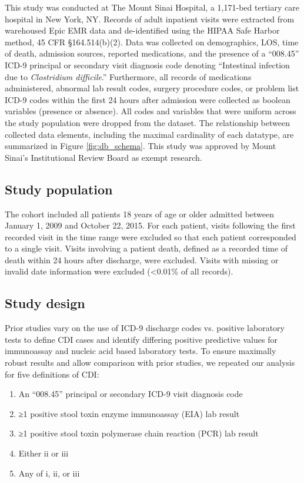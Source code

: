 This study was conducted at The Mount Sinai Hospital, a 1,171-bed tertiary care hospital in New York, NY. Records of adult inpatient visits were extracted from warehoused Epic EMR data and de-identified using the HIPAA Safe Harbor method, 45 CFR §164.514(b)(2). Data was collected on demographics, LOS, time of death, admission sources, reported medications, and the presence of a “008.45” ICD-9 principal or secondary visit diagnosis code denoting “Intestinal infection due to \emph{Clostridium difficile}.” Furthermore, all records of medications administered, abnormal lab result codes, surgery procedure codes, or problem list ICD-9 codes within the first 24 hours after admission were collected as boolean variables (presence or absence). All codes and variables that were uniform across the study population were dropped from the dataset. The relationship between collected data elements, including the maximal cardinality of each datatype, are summarized in Figure \ref{fig:db_schema}. This study was approved by Mount Sinai’s Institutional Review Board as exempt research.

\subsection{Study population}

The cohort included all patients 18 years of age or older admitted between January 1, 2009 and October 22, 2015. For each patient, visits following the first recorded visit in the time range were excluded so that each patient corresponded to a single visit. Visits involving a patient death, defined as a recorded time of death within 24 hours after discharge, were excluded. Visits with missing or invalid date information were excluded (<0.01\% of all records). 

\subsection{Study design}

Prior studies vary on the use of ICD-9 discharge codes vs. positive laboratory tests to define CDI cases\autocite{Gabriel2014,Zhang2016} and identify differing positive predictive values for immunoassay and nucleic acid based laboratory tests.\autocite{Bagdasarian2015,Moehring2013,Polage2015} To ensure maximally robust results and allow comparison with prior studies, we repeated our analysis for five definitions of CDI:

\begin{enumerate}[label=(\roman*),noitemsep,labelindent=2em,leftmargin=!]
\item An “008.45” principal or secondary ICD-9 visit diagnosis code
\item ≥1 positive stool toxin enzyme immunoassay (EIA) lab result
\item ≥1 positive stool toxin polymerase chain reaction (PCR) lab result
\item Either ii or iii
\item Any of i, ii, or iii
\end{enumerate}

